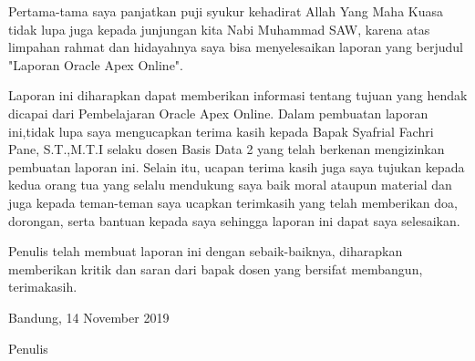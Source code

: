 \begin{acknowledgements}

Pertama-tama saya panjatkan puji syukur kehadirat Allah Yang Maha Kuasa tidak lupa juga kepada junjungan kita Nabi Muhammad SAW, karena atas limpahan rahmat dan hidayahnya saya bisa menyelesaikan laporan yang berjudul "Laporan Oracle Apex Online". 

Laporan ini diharapkan dapat memberikan informasi tentang tujuan yang hendak dicapai dari Pembelajaran Oracle Apex Online. Dalam pembuatan laporan ini,tidak lupa saya mengucapkan terima kasih kepada Bapak Syafrial Fachri Pane, S.T.,M.T.I selaku dosen Basis Data 2 yang telah berkenan mengizinkan pembuatan laporan ini. Selain itu, ucapan terima kasih juga saya tujukan kepada kedua orang tua yang selalu mendukung saya baik moral ataupun material dan juga kepada teman-teman saya ucapkan terimkasih yang telah memberikan doa, dorongan, serta bantuan kepada saya sehingga laporan ini dapat saya selesaikan.

Penulis telah membuat laporan ini dengan sebaik-baiknya, diharapkan memberikan kritik dan saran dari bapak dosen yang bersifat membangun, terimakasih.

\begin{raggedleft}

Bandung, 14 November 2019

Penulis

\end{raggedleft}

\end{acknowledgements}